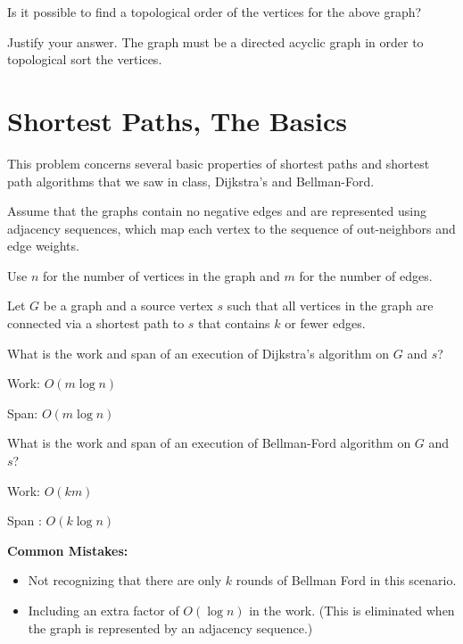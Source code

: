 \begin{problem}[4]

\asktf Is it possible to find a topological order of the vertices
for the above graph?

\solf


\ask 
Justify your answer.
\sol
The graph must be a directed acyclic graph in order to
topological sort the vertices.

\end{problem}



\section{Shortest Paths, The Basics}

This problem concerns several basic properties of shortest paths and
shortest path algorithms that we saw in class, Dijkstra's and
Bellman-Ford.

\begin{assumption}
Assume that the graphs contain no negative edges and are
represented using adjacency sequences,  which map each
vertex to the sequence of out-neighbors and edge weights.

Use $n$ for the number of vertices in the graph and $m$ for the number
of edges.
\end{assumption}



\begin{problem}

Let $G$ be a graph and a source vertex $s$ such that all vertices in
the graph are connected via a shortest path to $s$ that contains $k$
or fewer edges.

\ask
What is the work and span of an execution of Dijkstra's algorithm on
$G$ and $s$?

\sol Work: $O(m\log{n})$

\sol Span: $O(m\log{n})$

\ask
What is the work and span of an execution of Bellman-Ford algorithm on
$G$ and $s$?

\sol
Work: $O(km)$

\sol
Span : $O(k\log{n})$

\notes
\textbf{Common Mistakes:}
\begin{itemize}
	\item Not recognizing that there are only $k$ rounds of Bellman Ford in this
  scenario.

	\item Including an extra factor of $O(\log n)$ in the work. (This is
  eliminated when the graph is represented by an adjacency sequence.)
\end{itemize}
\end{problem}

